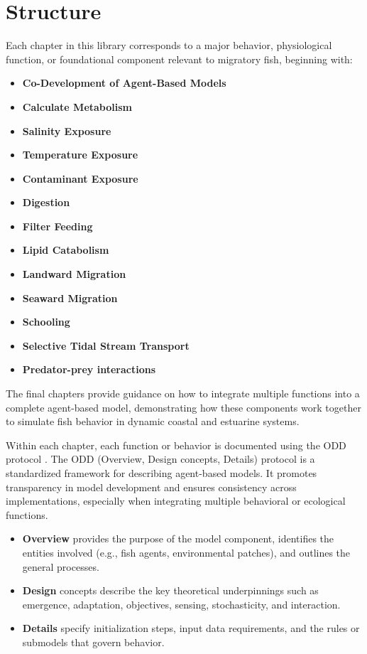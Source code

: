\documentclass[
]{book}
\begin{document}
\section{Structure}\label{structure}

Each chapter in this library corresponds to a major behavior, physiological function, or foundational component relevant to migratory fish, beginning with:

\begin{itemize}
\item
  \textbf{Co-Development of Agent-Based Models}
\item
  \textbf{Calculate Metabolism}
\item
  \textbf{Salinity Exposure}
\item
  \textbf{Temperature Exposure}
\item
  \textbf{Contaminant Exposure}
\item
  \textbf{Digestion}
\item
  \textbf{Filter Feeding}
\item
  \textbf{Lipid Catabolism}
\item
  \textbf{Landward Migration}
\item
  \textbf{Seaward Migration}
\item
  \textbf{Schooling}
\item
  \textbf{Selective Tidal Stream Transport}
\item
  \textbf{Predator-prey interactions}
\end{itemize}

The final chapters provide guidance on how to integrate multiple functions into a complete agent-based model, demonstrating how these components work together to simulate fish behavior in dynamic coastal and estuarine systems.

Within each chapter, each function or behavior is documented using the ODD protocol \citep{grimm_pattern-oriented_2005, grimm_odd_2010, grimm_odd_2020}. The ODD (Overview, Design concepts, Details) protocol is a standardized framework for describing agent-based models. It promotes transparency in model development and ensures consistency across implementations, especially when integrating multiple behavioral or ecological functions.

\begin{itemize}
\item
  \textbf{Overview} provides the purpose of the model component, identifies the entities involved (e.g., fish agents, environmental patches), and outlines the general processes.
\item
  \textbf{Design} concepts describe the key theoretical underpinnings such as emergence, adaptation, objectives, sensing, stochasticity, and interaction.
\item
  \textbf{Details} specify initialization steps, input data requirements, and the rules or submodels that govern behavior.
\end{itemize}
\end{document}
